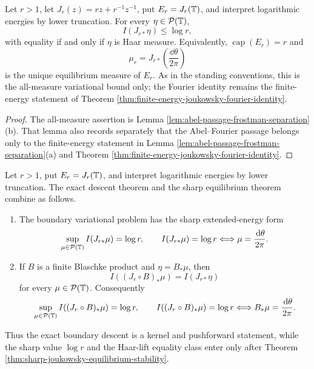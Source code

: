 \begin{theorem}\label{thm:sharp-joukowsky-equilibrium-stability}\label{thm:all-measure-joukowsky-equilibrium-bound}
Let \(r>1\), let \(J_r(z)=rz+r^{-1}z^{-1}\), put
\(E_r=J_r(\mathbb{T})\), and interpret logarithmic energies by lower
truncation.  For every \(\eta\in\mathcal P(\mathbb{T})\),
\[
I(J_{r\ast}\eta)\le \log r,
\]
with equality if and only if \(\eta\) is Haar measure.  Equivalently,
\(\operatorname{cap}(E_r)=r\) and
\[
\mu_r=J_{r\ast}\!\left(\frac{\dd\theta}{2\pi}\right)
\]
is the unique equilibrium measure of \(E_r\).
As in the standing conventions, this is the all-measure variational bound
only; the Fourier identity remains the finite-energy statement of Theorem
\ref{thm:finite-energy-joukowsky-fourier-identity}.
\end{theorem}

\begin{proof}
The all-measure assertion is Lemma
\ref{lem:abel-passage-frostman-separation}\textup{(b)}.  That lemma also
records separately that the Abel--Fourier passage belongs only to the
finite-energy statement in Lemma
\ref{lem:abel-passage-frostman-separation}\textup{(a)} and Theorem
\ref{thm:finite-energy-joukowsky-fourier-identity}.
\end{proof}

\begin{corollary}\label{cor:sharp-boundary-descent-joukowsky-covers}
Let \(r>1\), put \(E_r=J_r(\mathbb{T})\), and interpret logarithmic energies by lower truncation.  The exact descent theorem and the sharp equilibrium theorem combine as follows.
\begin{enumerate}[label=\textup{(\alph*)}]
  \item The boundary variational problem has the sharp extended-energy form
  \[
  \sup_{\mu\in\mathcal P(\mathbb{T})} I(J_{r\ast}\mu)=\log r,
  \qquad
  I(J_{r\ast}\mu)=\log r
  \Longleftrightarrow
  \mu=\frac{\,\mathrm{d}\theta}{2\pi}.
  \]

  \item If \(B\) is a finite Blaschke product and \(\eta=B_\ast\mu\), then
  \[
  I((J_r\circ B)_\ast\mu)=I(J_{r\ast}\eta)
  \]
  for every \(\mu\in\mathcal P(\mathbb{T})\).  Consequently
  \[
  \sup_{\mu\in\mathcal P(\mathbb{T})}I((J_r\circ B)_\ast\mu)=\log r,
  \qquad
  I((J_r\circ B)_\ast\mu)=\log r
  \Longleftrightarrow
  B_\ast\mu=\frac{\,\mathrm{d}\theta}{2\pi}.
  \]
\end{enumerate}
Thus the exact boundary descent is a kernel and pushforward statement, while the sharp value \(\log r\) and the Haar-lift equality class enter only after Theorem \ref{thm:sharp-joukowsky-equilibrium-stability}.
\end{corollary}

